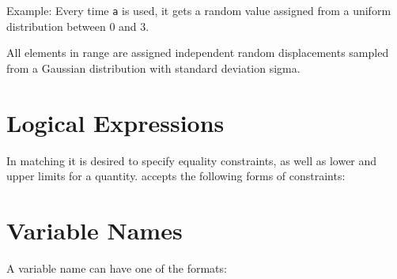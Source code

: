 Example: 
Every time \texttt{a} is used, it gets a random value assigned from a uniform
distribution between 0 and 3.  

All elements in range are assigned independent random displacements
sampled from a Gaussian distribution with standard deviation sigma.  



%
\section{Logical Expressions}
\label{sec:logicalexpr}

In matching it is desired to specify equality constraints, as well as
lower and upper limits for a quantity. \madx accepts the following forms
of constraints:  






%
\section{Variable Names}
\label{sec:variable}
A variable name can have one of the formats: 

